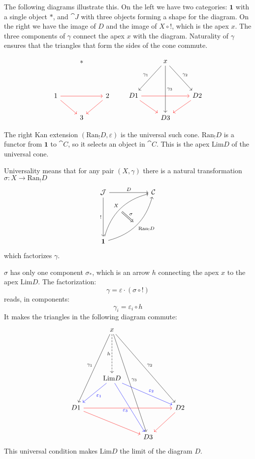 \documentclass[DaoFP]{subfiles}
\begin{document}
The following diagrams illustrate this. On the left we have two categories: $\mathbf 1$ with a single object $*$, and $\cat J$ with three objects forming a shape for the diagram. On the right we have the image of $D$ and the image of $X \circ !$, which is the apex $x$. The three components of $\gamma$ connect the apex $x$ with the diagram. Naturality of $\gamma$ ensures that the triangles that form the sides of the cone commute.

\[
 \begin{tikzcd}
  & *
 \\
\\
1 
\arrow[rr, red]
\arrow[rd, red]
&& 2
\arrow[dl, red]
\\
& 3
 \end{tikzcd}
 \qquad
 \begin{tikzcd}
  & x
\arrow[ddr, "\gamma_2"]
 \arrow[ddl, "\gamma_1"']
 \arrow[ddd, "\gamma_3"]
 \\
\\
D 1 
\arrow[rr, red]
\arrow[rd, red]
&& D 2
\arrow[dl, red]
\\
& D 3
 \end{tikzcd}
 \]



The right Kan extension $(\text{Ran}_! D, \varepsilon)$ is the universal such cone. $\text{Ran}_! D$ is a functor from $\mathbf 1$ to $\cat C$, so it selects an object in $\cat C$. This is the apex $\text{Lim} D$ of the universal cone. 

Universality means that for any pair $(X, \gamma)$ there is a natural transformation $\sigma \colon X \to \text{Ran}_! D$ 
\[
\begin{tikzcd}[row sep=2cm, column sep=2cm]
\cat J  \ar[d, "!"', "" {name=P}]
            \ar[r, "D", ""  {name=F, below, near start, bend right}]
&
\cat C
\\
\mathbf 1
    \ar[ur, bend left, "X", "" {name=G, below}]
    \ar[ur, bend right, "\text{Ran}_! D"', "" {name=Ran}]
\arrow[Rightarrow, "\sigma", from=G, to=Ran]
\end{tikzcd}
\]
which factorizes $\gamma$. 

$\sigma$ has only one component $\sigma_*$, which is an arrow $h$ connecting the apex $x$ to the apex $\text{Lim} D$. The factorization:
 \[ \gamma = \varepsilon \cdot (\sigma \circ !) \]
reads, in components:
\[ \gamma_i = \varepsilon_i \circ h \]
It makes the triangles in the following diagram commute:
\[
 \begin{tikzcd}[row sep=1cm]
  & x
\arrow[dddl, "\gamma_1"']
\arrow[ddddr, "\gamma_3"]
\arrow[dddrr, "\gamma_2"]
\arrow[dd, dashed, "h"']
 \\
 \\
 & \text{Lim} D
\arrow[dl, blue, "\varepsilon_1"]
\arrow[ddr, blue, "\varepsilon_3"']
\arrow[drr, blue, "\varepsilon_2"]
\\
D 1 
\arrow[rrr, red]
\arrow[rrd, red]
&&& D 2
\arrow[dl, red]
\\
&& D 3
 \end{tikzcd}
 \]
This universal condition makes $\text{Lim} D$ the limit of the diagram $D$.
\end{document}
